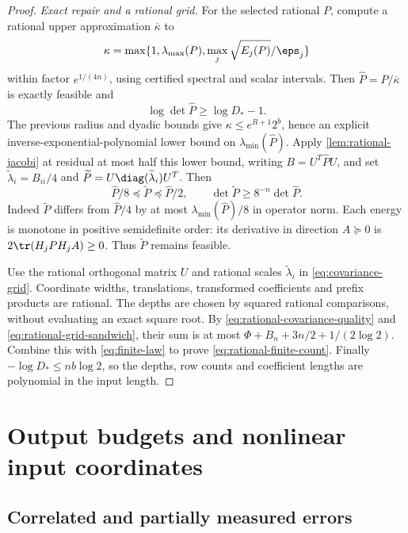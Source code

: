 \begin{proof}
\emph{Exact repair and a rational grid.} For the selected rational $P$,
compute a rational upper approximation $\overline\kappa$ to
\[
 \kappa=\max\{1,\lambda_{\max}(P),\max_j\sqrt{E_j(P)}/\eps_j\}
\]
within factor $e^{1/(4n)}$, using certified spectral and scalar intervals.
Then $\widehat P=P/\overline\kappa$ is exactly feasible and
\begin{equation}\label{eq:rational-covariance-quality}
 \log\det\widehat P\ge\log D_*-1.
\end{equation}
The previous radius and dyadic bounds give
$\kappa\le e^{R+1}2^b$, hence an explicit inverse-exponential-polynomial
lower bound on $\lambda_{\min}(\widehat P)$.
Apply \cref{lem:rational-jacobi} at residual at most half this lower
bound, writing $B=U^T\widehat P U$, and set
$\widetilde\lambda_i=B_{ii}/4$ and
$\widetilde P=U\diag(\widetilde\lambda_i)U^T$. Then
\begin{equation}\label{eq:rational-grid-sandwich}
 \widehat P/8\preceq\widetilde P\preceq\widehat P/2,
 \qquad \det\widetilde P\ge8^{-n}\det\widehat P.
\end{equation}
Indeed $\widetilde P$ differs from $\widehat P/4$ by at most
$\lambda_{\min}(\widehat P)/8$ in operator norm. Each energy is monotone
in positive semidefinite order: its derivative in direction $A\succeq0$
is $2\tr(H_jPH_jA)\ge0$. Thus $\widetilde P$ remains feasible.

Use the rational orthogonal matrix $U$ and rational scales
$\widetilde\lambda_i$ in \eqref{eq:covariance-grid}. Coordinate widths,
translations, transformed coefficients and prefix products are rational.
The depths are chosen by squared rational comparisons, without evaluating
an exact square root. By \eqref{eq:rational-covariance-quality} and
\eqref{eq:rational-grid-sandwich}, their sum is at most
$\Phi+B_n+3n/2+1/(2\log2)$. Combine this with
\eqref{eq:finite-law} to prove \eqref{eq:rational-finite-count}.
Finally $-\log D_*\le nb\log2$, so the depths, row counts and coefficient
lengths are polynomial in the input length.
\end{proof}

\section{Output budgets and nonlinear input coordinates}\label{sec:quadratic-bodies}

\subsection{Correlated and partially measured errors}

